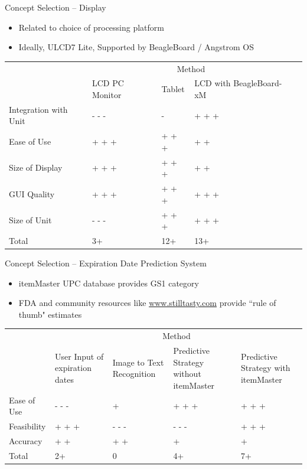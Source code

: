 \documentclass[t]{beamer}
\begin{document}
\begin{frame}{Concept Selection -- Display}
\begin{itemize}
\item Related to choice of processing platform
\item Ideally,  ULCD7 Lite, Supported by BeagleBoard / Angstrom OS
\end{itemize}
\vspace{.5cm}
\footnotesize
\begin{tabular}{| p{1.3in} | p{.7in} | p{0.7in} | p{1.0in} | p{.8in} |}
\cline{2-4}
\multicolumn{1}{c}{}&\multicolumn{3}{|c|}{Method} \\
\cline{2-4}
\multicolumn{1}{c|}{}&LCD PC \newline Monitor&Tablet&LCD with \newline BeagleBoard-xM\\
\hline
Integration with Unit&- - -&-&+ + +\\
\hline
Ease of Use&+ + +&+ + +&+ +\\
\hline
Size of Display& + + + &+ + +&+ +\\
\hline
GUI Quality&+ + +&+ + +&+ + +\\
\hline
Size of Unit&- - -&+ + +&+ + +\\
\hline
\hline
Total&3+&12+&13+\\
\hline
\end{tabular}
\end{frame}

\begin{frame}{Concept Selection -- Expiration Date Prediction System}
\begin{itemize}
\item itemMaster UPC database provides GS1 category
\item FDA and community resources like \url{www.stilltasty.com} provide ``rule of thumb" estimates
\end{itemize}
\vspace{.5cm}
\footnotesize
\begin{tabular}{| p{.7in} | p{.7in} | p{.8in} | p{.9in} | p{.8in} |}
\cline{2-5}
\multicolumn{1}{c}{}&\multicolumn{4}{|c|}{Method} \\
\cline{2-5}
\multicolumn{1}{c|}{}&User Input \newline of expiration \newline dates& Image to Text \newline Recognition & Predictive \newline Strategy without \newline itemMaster& Predictive \newline Strategy with \newline itemMaster \\
\hline
Ease of Use&- - -&+&+ + +&+ + +\\
\hline
Feasibility&+ + +&- - -&- - -&+ + +\\
\hline
Accuracy & + + & + + &+&+\\
\hline \hline
Total &2+ &0&4+&7+\\
\hline
\end{tabular}
\end{frame}
\end{document}
